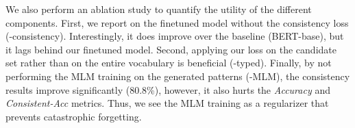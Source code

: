 
We also perform an ablation study to quantify the utility of
the different components. First, we report on the finetuned
model without the consistency loss
(-consistency). Interestingly, it does improve over the
baseline (BERT-base), but it lags behind our finetuned model.
Second, applying our loss on the candidate set rather than
on the entire vocabulary is beneficial (-typed). Finally, by
not performing the MLM training on the generated patterns
(-MLM), the consistency results improve significantly
(80.8\%), however, it also hurts the \textit{Accuracy} and \textit{Consistent-Acc}
metrics. Thus, we see the MLM training as a regularizer
that prevents catastrophic forgetting.


